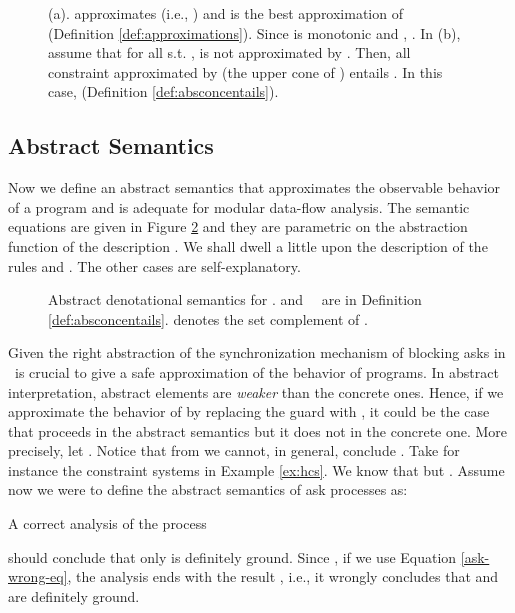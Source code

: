 \documentclass{tlp}
\begin{document}
\begin{figure}
\caption{(a).  approximates  (i.e., ) and  is the best approximation of  (Definition \ref{def:approximations}). Since   is monotonic and ,  . In (b), assume that for all  s.t. ,  is not approximated by . Then, all  constraint  approximated by  (the upper cone of ) entails . In this case,  (Definition \ref{def:absconcentails}). 
 \label{fig:abs-domains}}

\end{figure}


\subsection{Abstract Semantics}\label{sec:abssemantics}
Now we define an abstract semantics that  approximates the observable behavior of a program and is adequate for modular data-flow analysis. The semantic equations are given in Figure \ref{absdensems} and they are parametric on the abstraction function  of the description . We shall dwell a little upon the description of the  rules   and . The other cases are self-explanatory.
 


\begin{figure}
{

}
\caption{Abstract denotational semantics for \utcc.   and \ \  are  in Definition \ref{def:absconcentails}.  denotes the set complement of .\label{absdensems}}

\end{figure}

Given the right abstraction of the synchronization mechanism of blocking asks in \ccp\ is crucial to give a safe approximation of the behavior of programs. In abstract interpretation, abstract elements are \emph{weaker} than the concrete ones. Hence, if we approximate the behavior of  by replacing the guard  with  , it could be the case that  proceeds in the abstract semantics but it does not in the concrete one. More precisely,  let . Notice that  from   
we cannot, in general,  conclude . Take for instance  the constraint systems in Example \ref{ex:hcs}. We know that  but . 
Assume now we were to define the abstract semantics of  ask processes as:

A correct analysis of the process
   
 should conclude that only  is definitely ground. 
 Since , 
 if  we use   Equation \ref{ask-wrong-eq},  the analysis   ends with the result , i.e., it wrongly concludes that  and  are definitely ground. 
  
\end{document}
